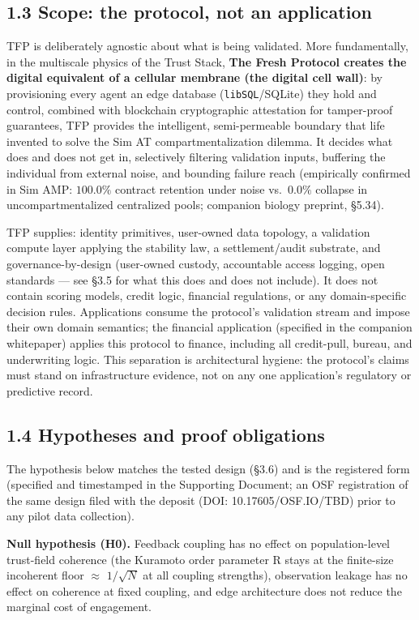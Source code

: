 \documentclass[11pt,twocolumn]{article}
\begin{document}
\subsection*{1.3 Scope: the protocol, not an
application}

TFP is deliberately agnostic about what is being validated. More fundamentally, in the multiscale physics of the Trust Stack, \textbf{The Fresh Protocol creates the digital equivalent of a cellular membrane (the digital cell wall)}: by provisioning every agent an edge database (\texttt{libSQL}/SQLite) they hold and control, combined with blockchain cryptographic attestation for tamper-proof guarantees, TFP provides the intelligent, semi-permeable boundary that life invented to solve the Sim AT compartmentalization dilemma. It decides what does and does not get in, selectively filtering validation inputs, buffering the individual from external noise, and bounding failure reach (empirically confirmed in Sim AMP: $100.0\%$ contract retention under noise vs.\ $0.0\%$ collapse in uncompartmentalized centralized pools; companion biology preprint, \S{}5.34).

TFP supplies: identity primitives, user-owned data topology, a validation compute
layer applying the stability law, a settlement/audit substrate, and
governance-by-design (user-owned custody, accountable access logging,
open standards --- see §3.5 for what this does and does not include). It
does not contain scoring models, credit logic, financial regulations, or
any domain-specific decision rules. Applications consume the protocol's
validation stream and impose their own domain semantics; the financial application (specified in the companion whitepaper) applies this protocol to finance, including all credit-pull, bureau, and
underwriting logic. This separation is architectural hygiene: the
protocol's claims must stand on infrastructure evidence, not on any one
application's regulatory or predictive record.

\subsection*{1.4 Hypotheses and proof
obligations}

The hypothesis below matches the tested design (§3.6) and is the
registered form (specified and timestamped in the Supporting Document;
an OSF registration of the same design filed with the deposit (DOI: 10.17605/OSF.IO/TBD) prior to any pilot data collection).

\textbf{Null hypothesis (H0).} Feedback coupling has no effect on
population-level trust-field coherence (the Kuramoto order parameter R
stays at the finite-size incoherent floor \(\approx\) \(1/\sqrt{N}\) at
all coupling strengths), observation leakage has no effect on coherence
at fixed coupling, and edge architecture does not reduce the marginal
cost of engagement.
\end{document}
